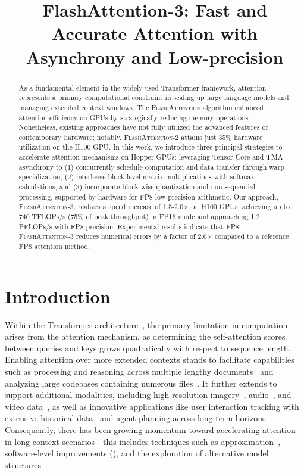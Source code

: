 \title{FlashAttention-3: Fast and Accurate Attention with Asynchrony and Low-precision}

\begin{abstract}
As a fundamental element in the widely used Transformer framework, attention represents a primary computational constraint in scaling up large language models and managing extended context windows. The \textsc{FlashAttention} algorithm enhanced attention efficiency on GPUs by strategically reducing memory operations. Nonetheless, existing approaches have not fully utilized the advanced features of contemporary hardware; notably, \textsc{FlashAttention-2} attains just 35\% hardware utilization on the H100 GPU. In this work, we introduce three principal strategies to accelerate attention mechanisms on Hopper GPUs: leveraging Tensor Core and TMA asynchrony to (1) concurrently schedule computation and data transfer through warp specialization, (2) interleave block-level matrix multiplications with softmax calculations, and (3) incorporate block-wise quantization and non-sequential processing, supported by hardware for FP8 low-precision arithmetic. Our approach, \textsc{FlashAttention-3}, realizes a speed increase of 1.5-2.0$\times$ on H100 GPUs, achieving up to 740 TFLOPs/s (75\% of peak throughput) in FP16 mode and approaching 1.2 PFLOPs/s with FP8 precision. Experimental results indicate that FP8 \textsc{FlashAttention-3} reduces numerical errors by a factor of 2.6$\times$ compared to a reference FP8 attention method.
\end{abstract}

\section{Introduction}
\label{sec:intro}

Within the Transformer architecture~\citep{vaswani2017attention}, the primary limitation in computation arises from the attention mechanism, as determining the self-attention scores between queries and keys grows quadratically with respect to sequence length. Enabling attention over more extended contexts stands to facilitate capabilities such as processing and reasoning across multiple lengthy documents~\citep{guo2021longt5,shaham2022scrolls,peng2023yarn} and analyzing large codebases containing numerous files~\citep{roziere2023code, li2023starcoder}. It further extends to support additional modalities, including high-resolution imagery~\citep{chen2022scaling}, audio~\citep{gulati2020conformer}, and video data~\citep{ho2022video}, as well as innovative applications like user interaction tracking with extensive historical data~\citep{sun2019bert4rec} and agent planning across long-term horizons~\citep{yao2022react}. Consequently, there has been growing momentum toward accelerating attention in long-context scenarios—this includes techniques such as approximation~\citep{katharopoulos2020transformers,choromanski2020rethinking, tay2020efficient}, software-level improvements (\citep{rabe2021self,dao2022flashattention,kwon2023efficient}), and the exploration of alternative model structures~\citep{peng2023rwkv,sun2023retentive,gu2023mamba}.

